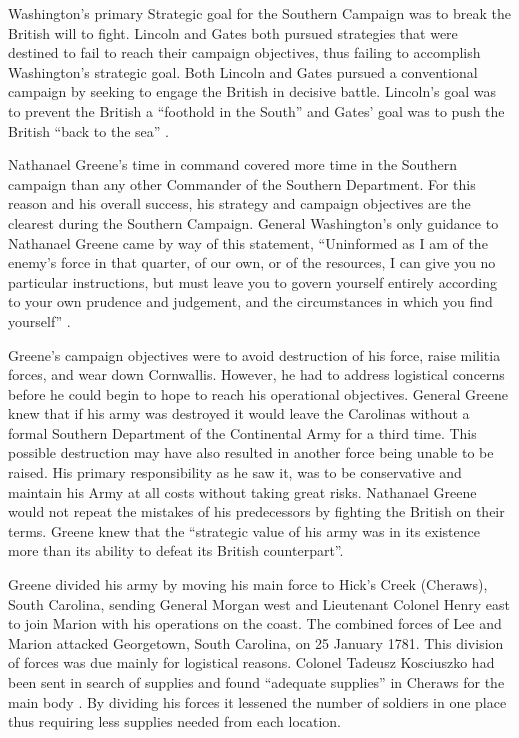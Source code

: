 Washington's primary Strategic goal for the Southern Campaign was to break the
British will to fight.  Lincoln and Gates both pursued strategies that were
destined to fail to reach their campaign objectives, thus failing to accomplish
Washington's strategic goal.  Both Lincoln and Gates pursued a conventional
campaign by seeking to engage the British in decisive battle.  Lincoln's goal
was to prevent the British a ``foothold in the South'' and Gates' goal was to
push the British ``back to the sea'' \cite[64]{woodward_comparative_2002}.

Nathanael Greene's time in command covered more time in the Southern campaign
than any other Commander of the Southern Department.  For this reason and his
overall success, his strategy and campaign objectives are the clearest during
the Southern Campaign.  General Washington's only guidance to Nathanael Greene
came by way of this statement, ``Uninformed as I am of the enemy's force in
that quarter, of our own, or of the resources, I can give you no particular
instructions, but must leave you to govern yourself entirely according to your
own prudence and judgement, and the circumstances in which you find yourself''
\cite[63]{woodward_comparative_2002}.

Greene's campaign objectives were to avoid destruction of his force, raise
militia forces, and wear down Cornwallis.  However, he had to address
logistical concerns before he could begin to hope to reach his operational
objectives.   General Greene knew that if his army was destroyed it would leave
the Carolinas without a formal Southern Department of the Continental Army for
a third time.   This possible destruction may have also resulted in another
force being unable to be raised.  His primary responsibility as he saw it, was
to be conservative and maintain his Army at all costs without taking great
risks. Nathanael Greene would not repeat the mistakes of his predecessors by
fighting the British on their terms.   Greene knew that the ``strategic value
of his army was in its existence more than its ability to defeat its British
counterpart''. \cite[66]{woodward_comparative_2002}

Greene divided his army by moving his main force to Hick's Creek (Cheraws),
South Carolina, sending General Morgan west and Lieutenant Colonel Henry east
to join Marion with his operations on the coast.  The combined forces of Lee
and Marion attacked Georgetown, South Carolina, on 25 January 1781.  This
division of forces was due mainly for logistical reasons.  Colonel Tadeusz
Kosciuszko had been sent in search of supplies and found ``adequate supplies''
in Cheraws for the main body
\cite[23]{moncure_cowpens_1996}\cite[27]{weigley_partisan_1970}.   By dividing
his forces it lessened the number of soldiers in one place thus requiring less
supplies needed from each location. 


